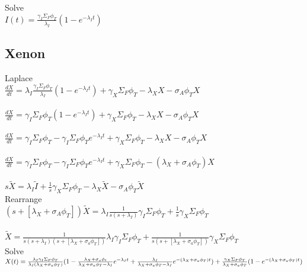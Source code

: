 \documentclass[11pt,a4paper]{article}
\begin{document}
\noindent Solve \\
$I(t)=\frac{\gamma_I\Sigma_F\phi_T}{\lambda_I}(1-e^{-\lambda_I t})$

\subsection{Xenon}
Laplace \\
$\frac{dX}{dt}=\lambda_I \frac{\gamma_I\Sigma_F\phi_T}{\lambda_I}(1-e^{-\lambda_I t}) + \gamma_X \Sigma_F \phi_T - \lambda_X X - \sigma_A \phi_T X$ \\ \\
$\frac{dX}{dt}=\gamma_I\Sigma_F\phi_T(1-e^{-\lambda_I t}) + \gamma_X \Sigma_F \phi_T - \lambda_X X - \sigma_A \phi_T X$ \\ \\
$\frac{dX}{dt}=\gamma_I\Sigma_F\phi_T - \gamma_I\Sigma_F\phi_T e^{-\lambda_I t} + \gamma_X \Sigma_F \phi_T - \lambda_X X - \sigma_A \phi_T X$ \\ \\
$\frac{dX}{dt}=\gamma_I\Sigma_F\phi_T - \gamma_I\Sigma_F\phi_T e^{-\lambda_I t} + \gamma_X \Sigma_F \phi_T - (\lambda_X + \sigma_A \phi_T) X$ \\ \\


$s\tilde{X}=\lambda_I\tilde{I}+\frac{1}{s}\gamma_X\Sigma_F\phi_T-\lambda_X\tilde{X}-\sigma_A\phi_T\tilde{X}$ \\

\noindent Rearrange \\
$(s+[\lambda_X+\sigma_A\phi_T])\tilde{X}=\lambda_I\frac{1}{s(s+\lambda_I)}\gamma_I\Sigma_F\phi_T+\frac{1}{s}\gamma_X\Sigma_F\phi_T$ \\ \\
$\tilde{X}=\frac{1}{s(s+\lambda_I)(s+[\lambda_X+\sigma_a\phi_T])}\lambda_I\gamma_I\Sigma_F\phi_T+\frac{1}{s(s+[\lambda_X+\sigma_a\phi_T])}\gamma_X\Sigma_F\phi_T$ \\

\noindent Solve \\
$X(t)=\frac{\lambda_I\gamma_I\Sigma_F\phi_T}{\lambda_I(\lambda_X+\sigma_a\phi_T)}(1-\frac{\lambda_X+\sigma_a\phi_t}{\lambda_X+\sigma_a\phi_T-\lambda_I}e^{-\lambda_It}+\frac{\lambda_I}{\lambda_X+\sigma_a\phi_T-\lambda_I}e^{-(\lambda_X+\sigma_a\phi_T)t}) \\
+ \frac{\gamma_X\Sigma_F\phi_T}{\lambda_X+\sigma_a\phi_T}(1-e^{-(\lambda_X+\sigma_a\phi_T)t})$
\end{document}
